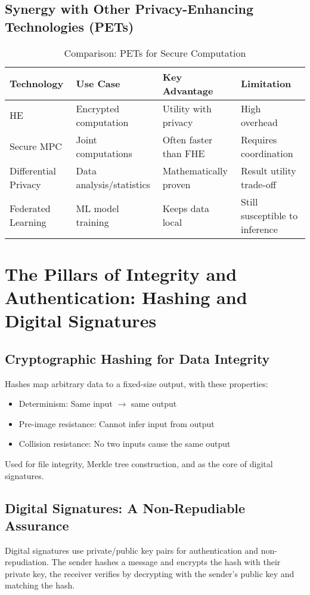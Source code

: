 \subsection{Synergy with Other Privacy-Enhancing Technologies (PETs)}
\begin{table}[h]
\centering
\caption{Comparison: PETs for Secure Computation}
\begin{tabular}{|l|l|l|l|}
\hline
\textbf{Technology} & \textbf{Use Case} & \textbf{Key Advantage} & \textbf{Limitation} \\
\hline
HE & Encrypted computation & Utility with privacy & High overhead \\
Secure MPC & Joint computations & Often faster than FHE & Requires coordination \\
Differential Privacy & Data analysis/statistics & Mathematically proven & Result utility trade-off \\
Federated Learning & ML model training & Keeps data local & Still susceptible to inference \\
\hline
\end{tabular}
\end{table}

\section{The Pillars of Integrity and Authentication: Hashing and Digital Signatures}

\subsection{Cryptographic Hashing for Data Integrity}
Hashes map arbitrary data to a fixed-size output, with these properties:
\begin{itemize}
    \item Determinism: Same input $\rightarrow$ same output
    \item Pre-image resistance: Cannot infer input from output
    \item Collision resistance: No two inputs cause the same output
\end{itemize}
Used for file integrity, Merkle tree construction, and as the core of digital signatures.

\subsection{Digital Signatures: A Non-Repudiable Assurance}
Digital signatures use private/public key pairs for authentication and non-repudiation. The sender hashes a message and encrypts the hash with their private key, the receiver verifies by decrypting with the sender's public key and matching the hash.

